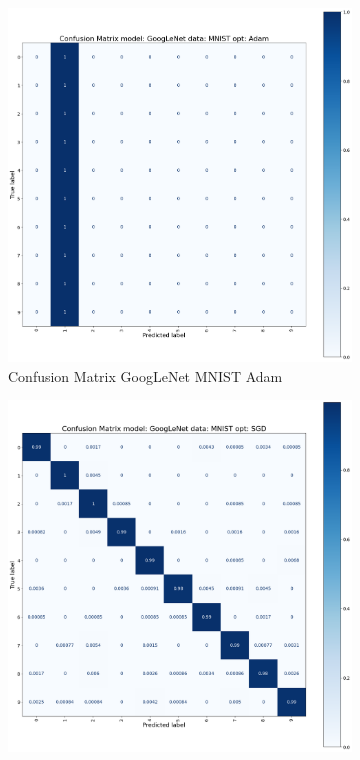 \documentclass[conference]{IEEEtran}
\begin{document}
\begin{figure}[!htbp]
    \centering
    \begin{subfigure}[b]{0.22\textwidth}
        \centering
        \includegraphics[width=\textwidth]{img/matrx_GoogLeNet_MNIST_Adam.png}
        \caption{Confusion Matrix GoogLeNet MNIST Adam}
        \label{fig:x imatrix_GoogLeNet_MNIST_Adam}
    \end{subfigure}
    \hfill
    \begin{subfigure}[b]{0.22\textwidth}
        \centering
        \includegraphics[width=\textwidth]{img/matrix_GoogLeNet_MNIST_SGD.png}

\end{subfigure}
\end{figure}
\end{document}
